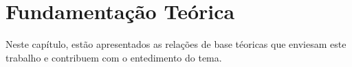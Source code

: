 \chapter{Fundamentação Teórica}\label{ch:fundamentacao-teorica}

Neste capítulo, estão apresentados as relações de base téoricas que
enviesam este trabalho e contribuem com o entedimento do tema.



